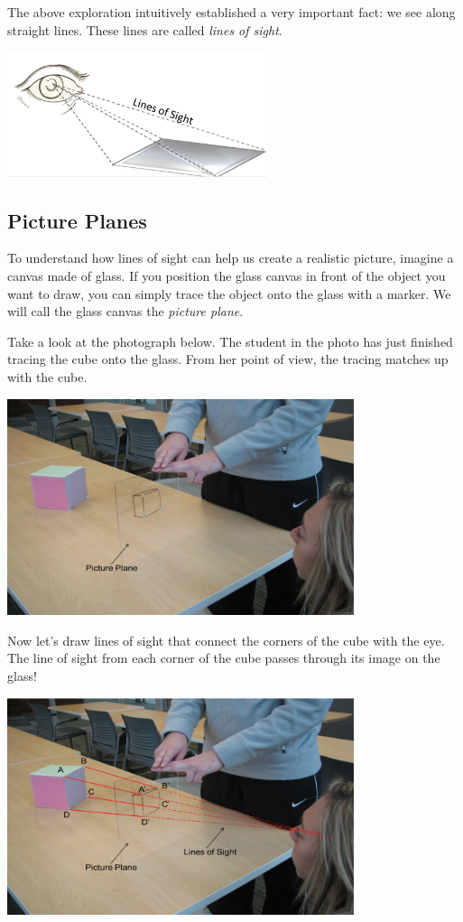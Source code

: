\documentclass{ximera}
\begin{document}
The above exploration intuitively established a very important fact: we see along straight lines.  These lines are called \emph{lines of sight}.
\begin{image}
         \includegraphics[width=3in]{linesOfSight.jpg}
\end{image}

\subsection*{Picture Planes}
To understand how lines of sight can help us create a realistic picture, imagine a canvas made of glass.  If you position the glass canvas in front of the object you want to draw, you can simply trace the object onto the glass with a marker.  We will call the glass canvas the \emph{picture plane}.

Take a look at the photograph below.  The student in the photo has just finished tracing the cube onto the glass.  From her point of view, the tracing matches up with the cube. 

\begin{image}
         \includegraphics[width=4in]{cube.jpg}
\end{image}

Now let’s draw lines of sight that connect the corners of the cube with the eye. The line of sight from each corner of the cube passes through its image on the glass!  

\begin{image}
         \includegraphics[width=4in]{cubeLines.jpg}
\end{image}
\end{document}
